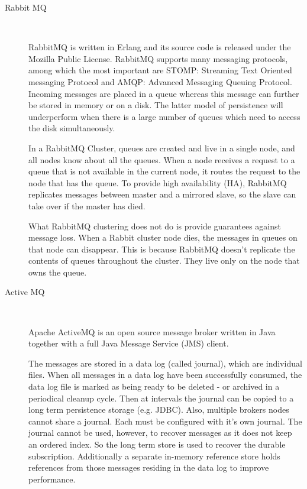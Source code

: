 \begin{description}
    \item [Rabbit MQ] \hfill \\
    {
    RabbitMQ is written in Erlang and its source code is released under the
    Mozilla Public License. RabbitMQ supports many messaging protocols, among
    which the most important are STOMP: Streaming Text Oriented messaging
    Protocol and AMQP: Advanced Messaging Queuing Protocol. Incoming messages
    are placed in a queue whereas this message can further be stored in memory
    or on a disk. The latter model of persistence will underperform when there is 
    a large number of queues which need to access the disk simultaneously.
    \cite{rabbitmq}

    In a RabbitMQ Cluster, queues are created and live in a single node, and all
    nodes know about all the queues. When a node receives a request to a queue
    that is not available in the current node, it routes the request to the node
    that has the queue. To provide high availability (HA), RabbitMQ replicates
    messages between master and a mirrored slave, so the slave can take over if the
    master has died. \cite{wickramarachchi2012andes}

    What RabbitMQ clustering does not do is provide guarantees against message loss.
    When a Rabbit cluster node dies, the messages in queues on that
    node can disappear. This is because RabbitMQ doesn't replicate the contents
    of queues throughout the cluster. They live only on the node that owns the
    queue. \cite{videla2012rabbitmq}
    }
    \item [Active MQ] \hfill \\
    {
    Apache ActiveMQ is an open source message broker written in Java
    together with a full Java Message Service (JMS) client. 

    The messages are stored in a data log (called journal), which are individual
    files. When all messages in a data log have been successfully consumed, the
    data log file is marked as being ready to be deleted - or archived in a
    periodical cleanup cycle. Then at intervals the journal can be copied to a
    long term persistence storage (e.g. JDBC). Also, multiple brokers nodes
    cannot share a journal. Each must be configured with it's own journal. The
    journal cannot be used, however, to recover messages as it does not keep an
    ordered index. So the long term store is used to recover the durable
    subscription. Additionally a separate in-memory reference store holds
    references from those messages residing in the data log to improve
    performance.

}
\end{description}
